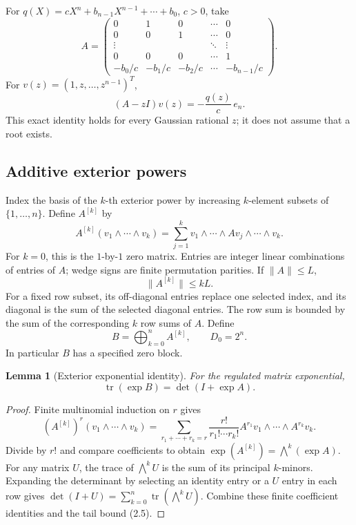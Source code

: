 \documentclass[11pt]{article}
\newtheorem{lemma}[theorem]{Lemma}
\theoremstyle{definition}
\newcommand{\tr}{\operatorname{tr}}
\begin{document}
For \(q(X)=cX^n+b_{n-1}X^{n-1}+\cdots+b_0\), \(c>0\), take
\[
 A=\begin{pmatrix}
 0&1&0&\cdots&0\\
 0&0&1&\cdots&0\\
 \vdots&&&\ddots&\vdots\\
 0&0&0&\cdots&1\\
 -b_0/c&-b_1/c&-b_2/c&\cdots&-b_{n-1}/c
 \end{pmatrix}.
 \tag{5.1}
\]
For \(v(z)=(1,z,\ldots,z^{n-1})^T\),
\[
 (A-zI)v(z)=-\frac{q(z)}c\,e_n. \tag{5.2}
\]
This exact identity holds for every Gaussian rational \(z\); it does
not assume that a root exists.

\subsection{Additive exterior powers}

Index the basis of the \(k\)-th exterior power by increasing \(k\)-element
subsets of \(\{1,\ldots,n\}\). Define \(A^{[k]}\) by
\[
 A^{[k]}(v_1\wedge\cdots\wedge v_k)
  =\sum_{j=1}^k v_1\wedge\cdots\wedge Av_j
                       \wedge\cdots\wedge v_k.
 \tag{5.3}
\]
For \(k=0\), this is the \(1\)-by-\(1\) zero matrix.
Entries are integer linear combinations of entries of \(A\);
wedge signs are finite permutation parities. If \(\|A\|\le L\),
\[
 \|A^{[k]}\|\le kL. \tag{5.4}
\]
For a fixed row subset, its off-diagonal entries replace one selected
index, and its diagonal is the sum of the selected diagonal entries.
The row sum is bounded by the sum of the corresponding \(k\) row sums
of \(A\). Define
\[
 B=\bigoplus_{k=0}^n A^{[k]},\qquad D_0=2^n. \tag{5.5}
\]
In particular \(B\) has a specified zero block.

\begin{lemma}[Exterior exponential identity]\label{lem:exterior}
For the regulated matrix exponential,
\[
 \tr(\exp B)=\det(I+\exp A). \tag{5.6}
\]
\end{lemma}
\begin{proof}
Finite multinomial induction on \(r\) gives
\[
 (A^{[k]})^r(v_1\wedge\cdots\wedge v_k)
 =\sum_{r_1+\cdots+r_k=r}
 \frac{r!}{r_1!\cdots r_k!}
 A^{r_1}v_1\wedge\cdots\wedge A^{r_k}v_k.
\]
Divide by \(r!\) and compare coefficients to obtain
\(\exp(A^{[k]})=\bigwedge^k(\exp A)\).
For any matrix \(U\), the trace of \(\bigwedge^k U\) is the sum of its
principal \(k\)-minors. Expanding the determinant by selecting an identity
entry or a \(U\) entry in each row gives
\(\det(I+U)=\sum_{k=0}^n\tr(\bigwedge^k U)\).
Combine these finite coefficient identities and the tail bound (2.5).
\end{proof}
\end{document}
